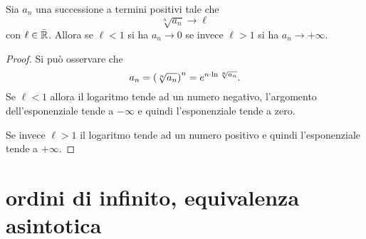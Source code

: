 \begin{theorem}
\label{th:criterio_radice}%
\mymark{***}%
%
%
Sia $a_n$ una successione a termini positivi tale che
\[
  \sqrt[n]{a_n} \to \ell
\]
con $\ell \in \bar {\mathbb R}$.
Allora se $\ell<1$ si ha $a_n \to 0$ se invece $\ell > 1$ si ha $a_n \to +\infty$.
\end{theorem}
%
\begin{comment}
\begin{proof}
\mymark{**}
Consideriamo prima il caso $\ell < 1$.
Se $\lim \sqrt[n]{a_n} = \ell$ significa che per ogni $\eps>0$ la successione
$\sqrt[n]{a_n}$ risulta definitivamente minore di $\ell +\eps$.
Scegliendo opportunamente $\eps$ (ad esempio $\eps = (1-\ell)/2$) si potrà
avere $q = \ell+\eps < 1$. Dunque avremo definitivamente $\sqrt[n]{a_n}< q$
ovvero $a_n < q^n$. Per ipotesi $a_n\ge 0$
e quindi, tolto un numero finito di termini, si ottiene $0 \le a_n < q^n \to 0$
da cui $a_n \to 0$ (in quanto l'aver tolto un numero finito di termini non
cambia né il carattere né il limite della successione).

Se $\ell>1$ si potrà procedere in maniera analoga. Esisterà $q$ con $1 < q < \ell$ tale che definitivamente $\sqrt[n]{a_n} > q$ da cui $a_n > q^n \to +\infty$.
\end{proof}
\end{comment}

\begin{proof}
  Si può osservare che
  \[
    a_n = {\left( \sqrt[n]{a_n} \right)}^n
     = e^{n \cdot \ln \sqrt[n]{a_n}}.
  \]
  Se $\ell <1$ allora il logaritmo tende ad un numero negativo,
  l'argomento dell'esponenziale tende a $-\infty$ e quindi l'esponenziale tende a zero.

  Se invece $\ell>1$ il logaritmo tende ad un numero positivo e quindi l'esponenziale tende a $+\infty$.
\end{proof}

\section{ordini di infinito, equivalenza asintotica}

